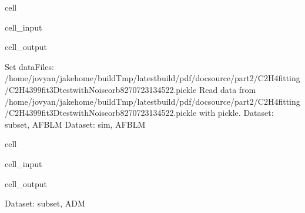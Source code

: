 \documentclass[letterpaper,table,10pt,english]{jupyterBook}
\begin{document}
\begin{sphinxuseclass}{cell}
\begin{sphinxVerbatimInput}
\begin{sphinxuseclass}{cell_input}
\begin{sphinxVerbatim}[commandchars=\\\{\}]
\end{sphinxVerbatim}

\end{sphinxuseclass}\end{sphinxVerbatimInput}
\begin{sphinxVerbatimOutput}

\begin{sphinxuseclass}{cell_output}
\begin{sphinxVerbatim}[commandchars=\\\{\}]
Set dataFiles: /home/jovyan/jake\PYGZhy{}home/buildTmp/\PYGZus{}latest\PYGZus{}build/pdf/doc\PYGZhy{}source/part2/C2H4fitting/C2H4\PYGZus{}399\PYGZus{}fit\PYGZus{}3D\PYGZhy{}test\PYGZus{}withNoise\PYGZus{}orb8\PYGZus{}270723\PYGZus{}13\PYGZhy{}45\PYGZhy{}22.pickle
Read data from /home/jovyan/jake\PYGZhy{}home/buildTmp/\PYGZus{}latest\PYGZus{}build/pdf/doc\PYGZhy{}source/part2/C2H4fitting/C2H4\PYGZus{}399\PYGZus{}fit\PYGZus{}3D\PYGZhy{}test\PYGZus{}withNoise\PYGZus{}orb8\PYGZus{}270723\PYGZus{}13\PYGZhy{}45\PYGZhy{}22.pickle with pickle.
Dataset: subset, AFBLM
Dataset: sim, AFBLM
\end{sphinxVerbatim}

\noindent{}

\end{sphinxuseclass}\end{sphinxVerbatimOutput}

\end{sphinxuseclass}
\begin{sphinxuseclass}{cell}\begin{sphinxVerbatimInput}

\begin{sphinxuseclass}{cell_input}
\begin{sphinxVerbatim}[commandchars=\\\{\}]
  
\end{sphinxVerbatim}

\end{sphinxuseclass}\end{sphinxVerbatimInput}
\begin{sphinxVerbatimOutput}

\begin{sphinxuseclass}{cell_output}
\begin{sphinxVerbatim}[commandchars=\\\{\}]
Dataset: subset, ADM
\end{sphinxVerbatim}

\noindent{}

\end{sphinxuseclass}\end{sphinxVerbatimOutput}

\end{sphinxuseclass}
\end{document}
